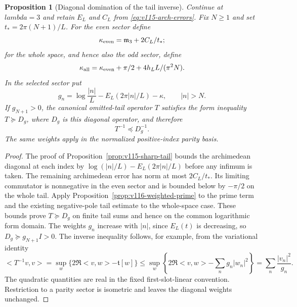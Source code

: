 \documentclass[11pt]{article}
\def\lambda{lambda}%
\def\ip#1#2{<#1,#2>}%
\newtheorem{proposition}[theorem]{Proposition}
\theoremstyle{remark}
\newcommand{\ip}[2]{\left\langle #1,#2\right\rangle}
\begin{document}
\begin{proposition}[Diagonal domination of the tail inverse]
\label{prop:v116-diagonal-inverse}
Continue at $\lambda=3$ and retain $E_L$ and $C_L$ from
\eqref{eq:v115-arch-errors}. Fix $N\ge1$ and set
$t_*=2\pi(N+1)/L$. For the even sector define
\[
 \kappa_{\rm even}=\mathfrak m_3+2C_L/t_*;
\]
for the whole space, and hence also the odd sector, define
\[
 \kappa_{\rm all}=\kappa_{\rm even}+\pi/2
                         +4h_LL/(\pi^2N).
\]
In the selected sector put
\begin{equation}\label{eq:v116-diagonal-weight}
 g_n=\log\frac{|n|}{L}-E_L(2\pi|n|/L)-\kappa,
            \qquad |n|>N.
\end{equation}
If $g_{N+1}>0$, the canonical omitted-tail operator $T$ satisfies
the form inequality $T\succeq D_g$, where $D_g$ is this diagonal
operator, and therefore
\begin{equation}\label{eq:v116-inverse-order}
 T^{-1}\preceq D_g^{-1}.
\end{equation}
The same weights apply in the normalized positive-index parity basis.
\end{proposition}
\begin{proof}
The proof of Proposition~\ref{prop:v115-sharp-tail} bounds the
archimedean diagonal at each index by
$\log(|n|/L)-E_L(2\pi|n|/L)$ before any infimum is taken.
The remaining archimedean error has norm at most $2C_L/t_*$.
Its limiting commutator is nonnegative in the even sector and is
bounded below by $-\pi/2$ on the whole tail. Apply
Proposition~\ref{prop:v116-weighted-prime} to the prime term and the
existing negative-pole tail estimate to the whole-space case.
These bounds prove $T\succeq D_g$ on finite tail sums and hence on
the common logarithmic form domain. The weights $g_n$ increase with
$|n|$, since $E_L(t)$ is decreasing, so $D_g\succeq g_{N+1}I>0$.
The inverse inequality follows, for example, from the variational
identity
\[
 \ip{T^{-1}v}{v}
 =\sup_w\{2\Re\ip vw-\mathfrak t[w]\}
 \le\sup_w\left\{2\Re\ip vw-\sum_n g_n|w_n|^2\right\}
 =\sum_n\frac{|v_n|^2}{g_n}.
\]
The quadratic quantities are real in the fixed first-slot-linear
convention. Restriction to a parity sector is isometric and leaves
the diagonal weights unchanged.
\end{proof}
\end{document}
